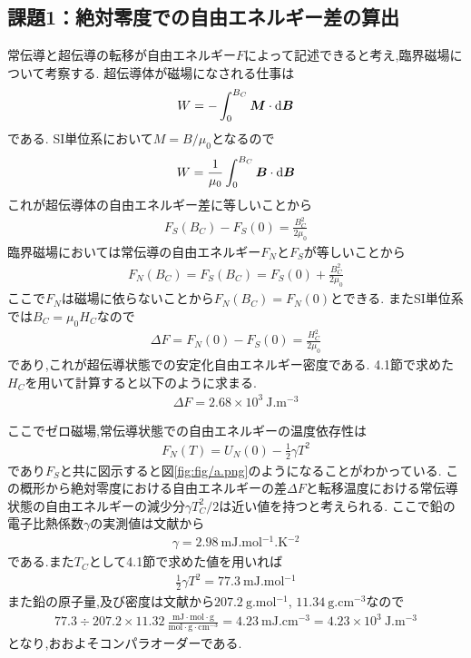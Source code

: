 \subsection{課題1：絶対零度での自由エネルギー差の算出}
常伝導と超伝導の転移が自由エネルギー$F$によって記述できると考え,臨界磁場について考察する.
超伝導体が磁場になされる仕事は
\begin{align}
  W=-\int_0^{B_C}{\bm M}\cdot{\rm d}{\bm B}
\end{align}
である.
SI単位系において$M=B/\mu_0$となるので\cite{kittel}
\begin{align}
  W=\frac{1}{\mu_0}\int_0^{B_C}{\bm B}\cdot{\rm d}{\bm B}
\end{align}
これが超伝導体の自由エネルギー差に等しいことから
\begin{align}
  F_S(B_C)-F_S(0)=\frac{B_C^2}{2\mu_0}
\end{align}
臨界磁場においては常伝導の自由エネルギー$F_N$と$F_S$が等しいことから
\begin{align}
  F_N(B_C)=F_S(B_C)=F_S(0)+\frac{B_C^2}{2\mu_0}
\end{align}
ここで$F_N$は磁場に依らないことから$F_N(B_C)=F_N(0)$とできる.
またSI単位系では$B_C=\mu_0H_C$なので
\begin{align}
  \Delta F=F_N(0)-F_S(0)=\frac{H_C^2}{2\mu_0}
\end{align}
であり,これが超伝導状態での安定化自由エネルギー密度である.
4.1節で求めた$H_C$を用いて計算すると以下のように求まる.
\begin{align}
  \Delta F=2.68\times10^3\ \si{\joule.\metre^{-3}}
\end{align}

ここでゼロ磁場,常伝導状態での自由エネルギーの温度依存性は
\begin{align}
  F_N(T)=U_N(0)-\frac{1}{2}\gamma T^2
\end{align}
であり$F_S$と共に図示すると図\ref{fig:fig/a.png}のようになることがわかっている.
この概形から絶対零度における自由エネルギーの差$\Delta F$と転移温度における常伝導状態の自由エネルギーの減少分$\gamma T_C^2/2$は近い値を持つと考えられる.
ここで鉛の電子比熱係数$\gamma$の実測値は文献\cite{kittel}から
\begin{align}
  \gamma=2.98\ \si{\milli\joule.\mole^{-1}.\kelvin^{-2}}
\end{align}
である.また$T_C$として4.1節で求めた値を用いれば
\begin{align}
  \frac{1}{2}\gamma T^2=77.3\ \si{\milli\joule.\mole^{-1}}
\end{align}
また鉛の原子量,及び密度は文献\cite{rikanenpyo}から$207.2\ \si{\gram.\mole^{-1}}$, $11.34\ \si{\gram.\centi\metre^{-3}}$なので
\begin{align}
  77.3\div 207.2\times 11.32\ \frac{\si{\milli\joule}\cdot\si{\mole}\cdot\si{\gram}}{\si{\mole}\cdot\si{\gram}\cdot\si{\centi\metre^{-3}}}=4.23\ \si{\milli\joule.\centi\metre^{-3}}=4.23\times10^3\ \si{\joule.\metre^{-3}}
\end{align}
となり,おおよそコンパラオーダーである.

